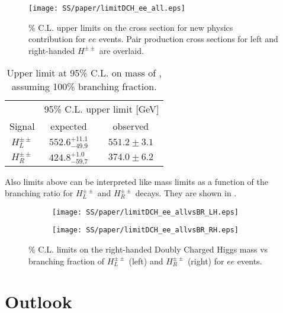 \begin{figure}[h]
\begin{center}
\texttt{[image: SS/paper/limitDCH\_ee\_all.eps]}
\caption{\% C.L. upper limits on the cross section for new physics contribution for $ee$ events.  
Pair production cross sections for left and right-handed $H^{\pm\pm}$ are overlaid.}
\label{fig:dch_limits_mass}
\end{center}
\end{figure}

\begin{table}[htbp]
\caption{Upper limit at 95\% C.L. on mass of \dch, assuming 100\% branching fraction.}
\begin{center}
\begin{tabular}{c||c|c}
& \multicolumn{2}{c}{95\%  C.L. upper limit [GeV]}\\
Signal & expected & observed \\
\hline
$H^{\pm\pm}_L$ & $552.6^{+11.1}_{-49.9}$ & $551.2 \pm 3.1$ \\
\hline
$H^{\pm\pm}_R$ & $424.8^{+1.0}_{-59.7}$ & $374.0 \pm 6.2$ \\
\end{tabular}
\end{center}
\label{tab:limits_mass}
\end{table}

Also limits above can be interpreted like mass limits as a function of the branching ratio for $H^{\pm\pm}_L$ and $H^{\pm\pm}_R$ decays.
They are shown in .

\begin{figure}
\begin{subfigure}{.5\textwidth}
  \centering
  \texttt{[image: SS/paper/limitDCH\_ee\_allvsBR\_LH.eps]}
\end{subfigure}%
\begin{subfigure}{.5\textwidth}
  \centering
  \texttt{[image: SS/paper/limitDCH\_ee\_allvsBR\_RH.eps]}
\end{subfigure}
\caption{\% C.L. limits on the right-handed Doubly Charged Higgs mass vs 
branching fraction of $H^{\pm\pm}_L$ (left) and $H^{\pm\pm}_R$ (right) for $ee$ events.}
  \label{fig:dch_limits_BR}
\end{figure}

\section{Outlook}
\label{sec:ssOutlook}

